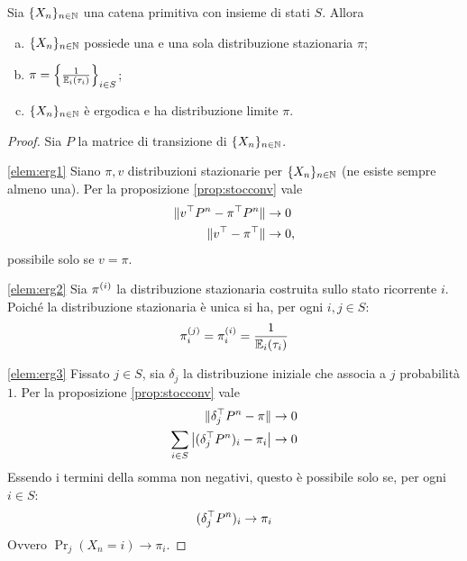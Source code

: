 \begin{thm}
	Sia $\{X_n\}_{n\in\mathbb N}$ una catena primitiva con insieme di stati $S$. Allora
	\begin{enumerate}[(a)]
		\item \label{elem:erg1} $\{X_n\}_{n\in\mathbb N}$ possiede una e una sola distribuzione stazionaria $\pi$;
		\item \label{elem:erg2} $\pi=\left\{ \frac{1}{\mathbb E_i(\tau_i)} \right\}_{i\in S}$;
		\item \label{elem:erg3} $\{X_n\}_{n\in\mathbb N}$ è ergodica e ha distribuzione limite $\pi$.
	\end{enumerate}
\end{thm}
\begin{proof}
	Sia $P$ la matrice di transizione di $\{X_n\}_{n\in\mathbb N}$.

	\ref{elem:erg1} Siano $\pi,v$ distribuzioni stazionarie per $\{X_n\}_{n\in\mathbb N}$ (ne esiste sempre almeno una). Per la proposizione \ref{prop:stocconv} vale
	\begin{align*}
		\|v^\top P^n-\pi^\top P^n\| & \to 0        \\
		\|v^\top-\pi^\top\|         & \to 0 \text,
	\end{align*}
	possibile solo se $v=\pi$.

	\ref{elem:erg2} Sia $\pi^{(i)}$ la distribuzione stazionaria costruita sullo stato ricorrente $i$. Poiché la distribuzione stazionaria è unica si ha, per ogni $i,j\in S$:
	\begin{equation*}
		\pi^{(j)}_i = \pi^{(i)}_i = \frac{1}{\mathbb E_i(\tau_i)}
	\end{equation*}

	\ref{elem:erg3} Fissato $j\in S$, sia $\delta_j$ la distribuzione iniziale che associa a $j$ probabilità $1$. Per la proposizione \ref{prop:stocconv} vale
	\begin{align*}
		\|\delta_j^\top P^n-\pi\|                   & \to 0 \\
		\sum_{i\in S}\left|(\delta_j^\top P^n)_i-\pi_i\right| & \to 0
	\end{align*}
	Essendo i termini della somma non negativi, questo è possibile solo se, per ogni $i\in S$:
	\begin{equation*}
		(\delta_j^\top P^n)_i \to \pi_i
	\end{equation*}
	Ovvero $\Pr_j(X_n=i)\to \pi_i$. \qedhere
\end{proof}
